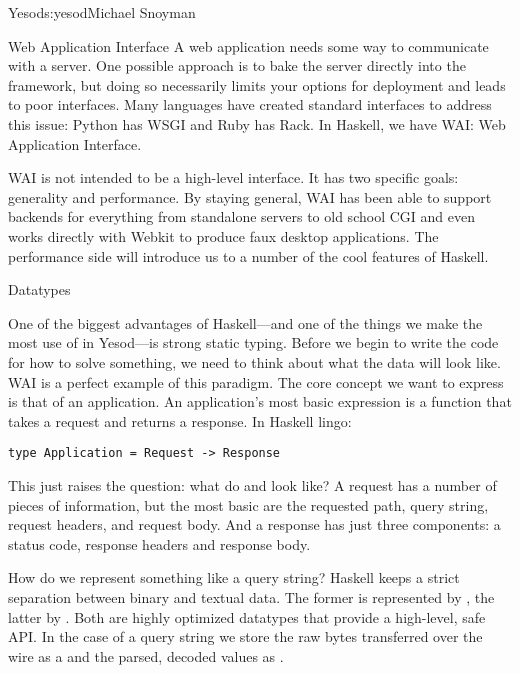 \begin{aosachapter}{Yesod}{s:yesod}{Michael Snoyman}
\begin{aosasect1}{Web Application Interface}
A web application needs some way to communicate with a server. One
possible approach is to bake the server directly into the framework,
but doing so necessarily limits your options for deployment and leads
to poor interfaces. Many languages have created standard interfaces to
address this issue: Python has WSGI and Ruby has Rack. In Haskell, we
have WAI: Web Application Interface.

WAI is not intended to be a high-level interface. It has two specific
goals: generality and performance. By staying general, WAI has been
able to support backends for everything from standalone servers to old
school CGI and even works directly with Webkit to produce faux desktop
applications. The performance side will introduce us to a number of
the cool features of Haskell.


\begin{aosasect2}{Datatypes}

One of the biggest advantages of Haskell---and one of the things we
make the most use of in Yesod---is strong static typing. Before we
begin to write the code for how to solve something, we need to think
about what the data will look like. WAI is a perfect example of this
paradigm. The core concept we want to express is that of an
application. An application's most basic expression is a function that
takes a request and returns a response. In Haskell lingo:

\begin{verbatim}
type Application = Request -> Response
\end{verbatim}

This just raises the question: what do  and  look like?
A request has a number of pieces of information, but the most basic
are the requested path, query string, request headers, and request
body. And a response has just three components: a status code,
response headers and response body.

How do we represent something like a query string? Haskell keeps a
strict separation between binary and textual data. The former is
represented by , the latter by . Both are highly
optimized datatypes that provide a high-level, safe API. In the case
of a query string we store the raw bytes transferred over the wire as a
 and the parsed, decoded values as .


\end{aosasect2}
\end{aosasect1}
\end{aosachapter}
